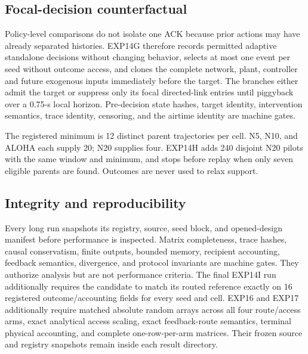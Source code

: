 \subsection{Focal-decision counterfactual}

Policy-level comparisons do not isolate one ACK because prior actions may have
already separated histories. EXP14G therefore records permitted adaptive
standalone decisions without changing behavior, selects at most one event per
seed without outcome access, and clones the complete network, plant, controller
and future exogenous inputs immediately before the target. The branches either
admit the target or suppress only its focal directed-link entries until
piggyback over a 0.75-s local horizon. Pre-decision state hashes, target
identity, intervention semantics, trace identity, censoring, and the airtime
identity are machine gates.

The registered minimum is 12 distinct parent trajectories per cell. N5,
N10, and ALOHA each supply 20; N20 supplies four. EXP14H adds 240 disjoint N20
pilots with the same window and minimum, and stops before replay when only
seven eligible parents are found. Outcomes are never used to relax support.

\subsection{Integrity and reproducibility}

Every long run snapshots its registry, source, seed block, and opened-design
manifest before performance is inspected. Matrix completeness, trace hashes,
causal conservatism, finite outputs, bounded memory, recipient accounting,
feedback semantics, divergence, and protocol invariants are machine gates.
They authorize analysis but are not performance criteria. The final EXP14I
run additionally requires the candidate to match its routed reference exactly
on 16 registered outcome/accounting fields for every seed and cell. EXP16 and
EXP17 additionally require matched absolute random arrays across all four
route/access arms, exact analytical access scaling, exact feedback-route
semantics, terminal physical accounting, and complete one-row-per-arm
matrices. Their frozen source and registry snapshots remain inside each result
directory.
